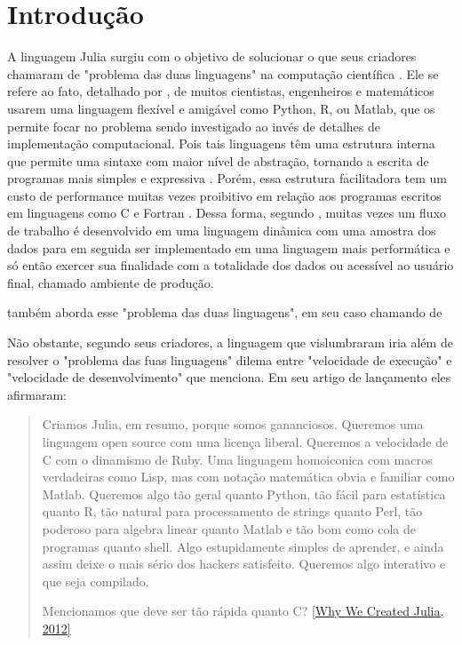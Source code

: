 % 



\chapter{ Introdu\c{c}\~{a}o}


A linguagem Julia surgiu com o objetivo de solucionar o que seus criadores chamaram de "problema das duas linguagens" na computação científica \cite{Bezanson2012}. Ele se refere ao fato, detalhado por \cite{Balbaert2016}, de muitos cientistas, engenheiros e matemáticos usarem uma linguagem flexível e amigável como Python, R, ou Matlab, que os permite focar no problema sendo investigado ao invés de detalhes de implementação computacional. Pois tais linguagens têm uma estrutura interna que permite uma sintaxe com maior nível de abstração, tornando a escrita de programas mais simples e expressiva \cite{Fangohr2004}. Porém, essa estrutura facilitadora tem um custo de performance muitas vezes proibitivo em relação aos programas escritos em linguagens como C e Fortran \cite{Nanz2015}. 
Dessa forma, segundo \cite{Balbaert2016}, muitas vezes um fluxo de trabalho é desenvolvido em uma linguagem dinâmica com uma amostra dos dados para em seguida ser implementado em uma linguagem mais performática e só então exercer sua finalidade com a totalidade dos dados ou acessível ao usuário final, chamado ambiente de produção. 

\cite{Klok2021} também aborda esse "problema das duas linguagens", em seu caso chamando de 

Não obstante, segundo seus criadores, a linguagem que vislumbraram iria além de resolver o "problema das fuas linguagens" dilema entre "velocidade de execução" e "velocidade de desenvolvimento" que \cite{Klok2021} menciona. Em seu artigo de lançamento eles afirmaram: 

\begin{quote}
   Criamos Julia, em resumo, porque somos gananciosos. 
   Queremos uma linguagem open source com uma licença liberal. Queremos a velocidade de C com o dinamismo de Ruby. Uma linguagem homoiconica com macros verdadeiras como Lisp, mas com notação matemática obvia e familiar como Matlab. Queremos algo tão geral quanto Python, tão fácil para estatística quanto R, tão natural para processamento de strings quanto Perl, tão poderoso para algebra linear quanto Matlab e tão bom como cola de programas quanto shell. Algo estupidamente simples de aprender, e ainda assim deixe o mais sério dos hackers satisfeito. Queremos algo interativo e que seja compilado. 
   
   Mencionamos que deve ser tão rápida quanto C? 
   \href{https://julialang.org/blog/2012/02/why-we-created-julia/}{[Why We Created Julia, 2012]}  \cite{Bezanson2012a}
   
   
\end{quote}

